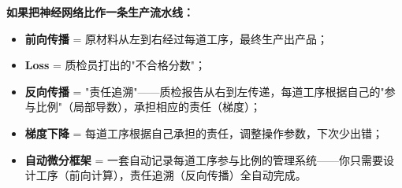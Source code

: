\documentclass[a4paper,11pt]{ctexart}
\begin{document}
\begin{metaphorbox}[给零基础读者的一句总比喻]
    \textbf{如果把神经网络比作一条生产流水线：}
    \begin{itemize}
        \item \textbf{前向传播} = 原材料从左到右经过每道工序，最终生产出产品；
        \item \textbf{Loss} = 质检员打出的"不合格分数"；
        \item \textbf{反向传播} = "责任追溯"——质检报告从右到左传递，每道工序根据自己的"参与比例"（局部导数），承担相应的责任（梯度）；
        \item \textbf{梯度下降} = 每道工序根据自己承担的责任，调整操作参数，下次少出错；
        \item \textbf{自动微分框架} = 一套自动记录每道工序参与比例的管理系统——你只需要设计工序（前向计算），责任追溯（反向传播）全自动完成。
    \end{itemize}
\end{metaphorbox}
\end{document}

